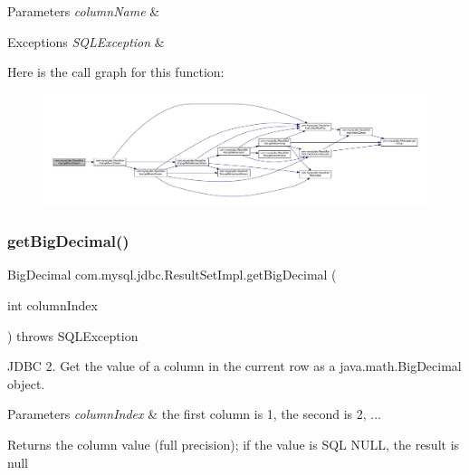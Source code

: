\begin{DoxyParams}{Parameters}
{\em column\+Name} & \\
\hline
\end{DoxyParams}

\begin{DoxyExceptions}{Exceptions}
{\em S\+Q\+L\+Exception} & \\
\hline
\end{DoxyExceptions}
Here is the call graph for this function\+:
\nopagebreak
\begin{figure}[H]
\begin{center}
\leavevmode
\includegraphics[width=350pt]{classcom_1_1mysql_1_1jdbc_1_1_result_set_impl_a87d456ff8fb48adfb5a12005afc51787_cgraph}
\end{center}
\end{figure}
\mbox{\label{classcom_1_1mysql_1_1jdbc_1_1_result_set_impl_a9a92d1b3d8bb0aaf7dce5b5c6b225bd9}} 
\subsubsection{\texorpdfstring{get\+Big\+Decimal()}{getBigDecimal()}\hspace{0.1cm}{\footnotesize\ttfamily [1/4]}}
{\footnotesize\ttfamily Big\+Decimal com.\+mysql.\+jdbc.\+Result\+Set\+Impl.\+get\+Big\+Decimal (\begin{DoxyParamCaption}\item[{int}]{column\+Index }\end{DoxyParamCaption}) throws S\+Q\+L\+Exception}

J\+D\+BC 2. Get the value of a column in the current row as a java.\+math.\+Big\+Decimal object.


\begin{DoxyParams}{Parameters}
{\em column\+Index} & the first column is 1, the second is 2, ...\\
\hline
\end{DoxyParams}
\begin{DoxyReturn}{Returns}
the column value (full precision); if the value is S\+QL N\+U\+LL, the result is null
\end{DoxyReturn}


